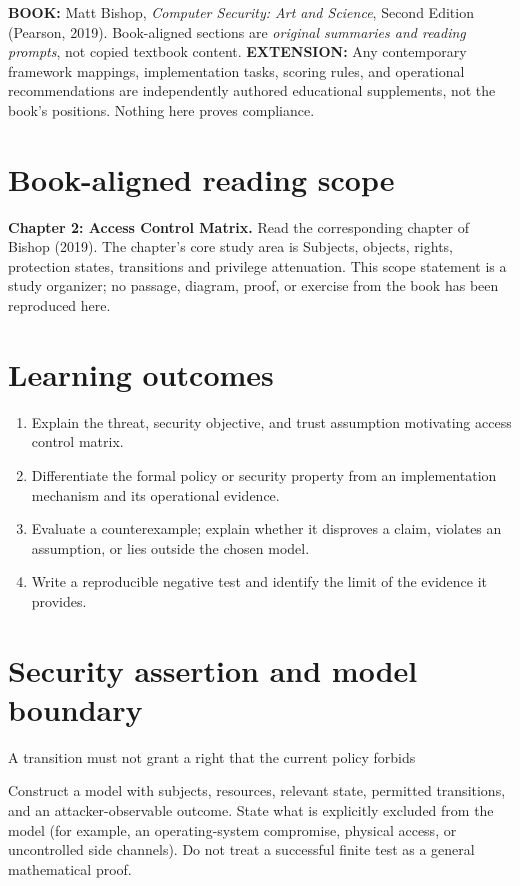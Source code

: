 \documentclass[10pt,letterpaper]{article}
\begin{document}
\makedoctocpage
\begin{notebox}
\textbf{BOOK:} Matt Bishop, \emph{Computer Security: Art and Science}, Second Edition (Pearson, 2019). Book-aligned sections are \emph{original summaries and reading prompts}, not copied textbook content.
\textbf{EXTENSION:} Any contemporary framework mappings, implementation tasks, scoring rules, and operational recommendations are independently authored educational supplements, not the book's positions. Nothing here proves compliance.
\end{notebox}
\section{Book-aligned reading scope}
\textbf{Chapter 2: Access Control Matrix.} Read the corresponding chapter of Bishop (2019). The chapter's core study area is Subjects, objects, rights, protection states, transitions and privilege attenuation. This scope statement is a study organizer; no passage, diagram, proof, or exercise from the book has been reproduced here.
\section{Learning outcomes}
\begin{enumerate}
\item Explain the threat, security objective, and trust assumption motivating access control matrix.
\item Differentiate the formal policy or security property from an implementation mechanism and its operational evidence.
\item Evaluate a counterexample; explain whether it disproves a claim, violates an assumption, or lies outside the chosen model.
\item Write a reproducible negative test and identify the limit of the evidence it provides.
\end{enumerate}
\section{Security assertion and model boundary}
\begin{infobox}
A transition must not grant a right that the current policy forbids
\end{infobox}
Construct a model with subjects, resources, relevant state, permitted transitions, and an attacker-observable outcome. State what is explicitly excluded from the model (for example, an operating-system compromise, physical access, or uncontrolled side channels). Do not treat a successful finite test as a general mathematical proof.
\end{document}
